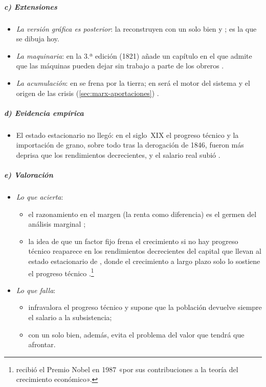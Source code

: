 \documentclass[11pt]{article}
\begin{document}
\subparagraph{c) Extensiones}
\begin{itemize}
\item \emph{La versión gráfica es posterior}: la reconstruyen con un solo bien \textcite{Kaldor1956Alternative} y \textcite{Pasinetti1960Mathematical}; es la que se dibuja hoy.
\item \emph{La maquinaria}: en la 3.ª edición (1821) añade un capítulo en el que admite que las máquinas pueden dejar sin trabajo a parte de los obreros\nocite{Ricardo1821Principles} .
\item \emph{La acumulación}: en  se frena por la tierra; en  será el motor del sistema y el origen de las crisis (\ref{sec:marx-aportaciones}) .
\end{itemize}

\subparagraph{d) Evidencia empírica}
\begin{itemize}
\item El estado estacionario no llegó: en el siglo~XIX el progreso técnico y la importación de grano, sobre todo tras la derogación de 1846, fueron más deprisa que los rendimientos decrecientes, y el salario real subió .
\end{itemize}

\subparagraph{e) Valoración}
\begin{itemize}
\item \emph{Lo que acierta}:
  \begin{itemize}
  \item el razonamiento en el margen (la renta como diferencia) es el germen del análisis marginal ;
  \item la idea de que un factor fijo frena el crecimiento si no hay progreso técnico reaparece en los rendimientos decrecientes del capital que llevan al estado estacionario de , donde el crecimiento a largo plazo solo lo sostiene el progreso técnico .\footnote{ recibió el Premio Nobel en 1987 «por sus contribuciones a la teoría del crecimiento económico»\nocite{Nobel1987Solow}.}
  \end{itemize}
\item \emph{Lo que falla}:
  \begin{itemize}
  \item infravalora el progreso técnico y supone que la población devuelve siempre el salario a la subsistencia;
  \item con un solo bien, además, evita el problema del valor que  tendrá que afrontar.
  \end{itemize}
\end{itemize}
\end{document}
